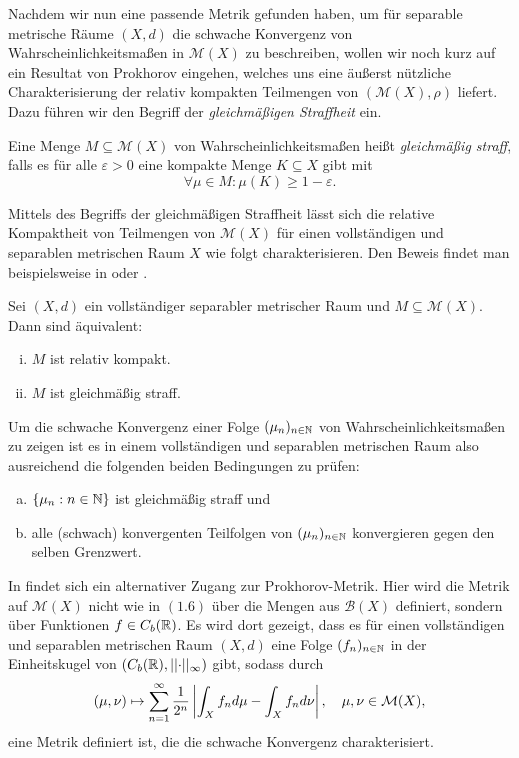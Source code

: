 Nachdem wir nun eine passende Metrik gefunden haben, um für separable metrische Räume $(X,d)$ die schwache Konvergenz von Wahrscheinlichkeitsmaßen in $\mathcal{M}(X)$ zu beschreiben, wollen wir noch kurz auf ein Resultat von Prokhorov eingehen, 
welches uns eine äußerst nützliche Charakterisierung der relativ kompakten Teilmengen von $(\mathcal{M}(X), \rho)$ liefert. 
Dazu führen wir den Begriff der \textit{gleichmäßigen Straffheit} ein.
\begin{mydef}
    Eine Menge $M \subseteq \mathcal{M}(X)$ von Wahrscheinlichkeitsmaßen heißt \textit{gleichmäßig straff}, 
    falls es für alle $\varepsilon > 0$ eine kompakte Menge $K \subseteq X$ gibt mit 
    $$
        \forall \mu \in M: \mu(K) \geq 1-\varepsilon. 
    $$
\end{mydef}

Mittels des Begriffs der gleichmäßigen Straffheit lässt sich die relative Kompaktheit von Teilmengen von $\mathcal{M}(X)$ für einen vollständigen und separablen metrischen Raum $X$ wie folgt charakterisieren. 
Den Beweis findet man beispielsweise in \cite[Theorem II.6.7]{parthasarathy} oder \cite[Theorem 5.1, Theorem 5.2]{billingsley}. 

\begin{theorem}
    Sei $(X,d)$ ein vollständiger separabler metrischer Raum und $M \subseteq \mathcal{M}(X)$. Dann sind äquivalent:
    \begin{enumerate}[(i)]
        \item $M$ ist relativ kompakt.
        \item $M$ ist gleichmäßig straff. 
    \end{enumerate}
\end{theorem}

Um die schwache Konvergenz einer Folge $(\mu_n)_{n \in \mathbb{N}}$ von Wahrscheinlichkeitsmaßen zu zeigen ist es in einem vollständigen und separablen metrischen Raum also ausreichend die folgenden beiden Bedingungen zu prüfen:
\begin{enumerate}[(a)]
    \item $\{\mu_n: n \in \mathbb{N}\}$ ist gleichmäßig straff und
    \item alle (schwach) konvergenten Teilfolgen von $(\mu_n)_{n \in \mathbb{N}}$ konvergieren gegen den selben Grenzwert.
\end{enumerate}

\begin{remark}
    In \cite{li-queffelec} findet sich ein alternativer Zugang zur Prokhorov-Metrik. Hier wird die Metrik auf $\mathcal{M}(X)$ nicht wie in $(1.6)$ über die Mengen aus $\mathcal{B}(X)$ definiert, sondern über Funktionen $f \in C_b(\mathbb{R})$.
    Es wird dort gezeigt, dass es für einen vollständigen und separablen metrischen Raum $(X,d)$ eine Folge $(f_n)_{n \in \mathbb{N}}$ in der Einheitskugel von $(C_b(\mathbb{R}), \lvert\lvert \cdot \rvert\rvert_{\infty})$ gibt, sodass durch
    $$
        (\mu, \nu) \mapsto \sum_{n=1}^{\infty}\frac{1}{2^n}\left| \int_Xf_nd\mu - \int_X f_n d\nu \right|, \quad \mu, \nu \in \mathcal{M}(X),
    $$
    eine Metrik definiert ist, die die schwache Konvergenz charakterisiert. 
\end{remark}
